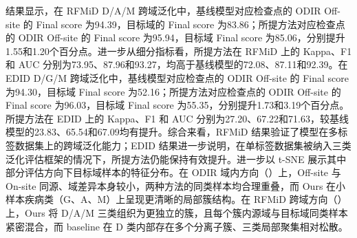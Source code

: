 结果显示，在 RFMiD D/A/M 跨域泛化中，基线模型对应检查点的 ODIR Off-site 的 Final score 为94.39，目标域的 Final score 为83.86；所提方法对应检查点的 ODIR Off-site 的 Final score 为95.94，目标域 Final score 为85.06，分别提升1.55和1.20个百分点。进一步从细分指标看，所提方法在 RFMiD 上的 Kappa、F1 和 AUC 分别为73.95、87.96和93.27，均高于基线模型的72.08、87.11和92.39。在 EDID D/G/M 跨域泛化中，基线模型对应检查点的 ODIR Off-site 的 Final score 为94.30，目标域 Final score 为52.16；所提方法对应检查点的 ODIR Off-site 的 Final score 为96.03，目标域 Final score 为55.35，分别提升1.73和3.19个百分点。所提方法在 EDID 上的 Kappa、F1 和 AUC 分别为27.20、67.22和71.63，较基线模型的23.83、65.54和67.09均有提升。综合来看，RFMiD 结果验证了模型在多标签数据集上的跨域泛化能力；EDID 结果进一步说明，在单标签数据集被纳入三类泛化评估框架的情况下，所提方法仍能保持有效提升。进一步以 t-SNE 展示其中部分评估方向下目标域样本的特征分布。在 ODIR 域内方向（）上，Off-site 与 On-site 同源、域差异本身较小，两种方法的同类样本均合理重叠，而 Ours 在小样本疾病类（G、A、M）上呈现更清晰的局部簇结构。在 RFMiD 跨域方向（）上，Ours 将 D/A/M 三类组织为更独立的簇，且每个簇内源域与目标域同类样本紧密混合，而 baseline 在 D 类内部存在多个分离子簇、三类局部聚集相对松散。

